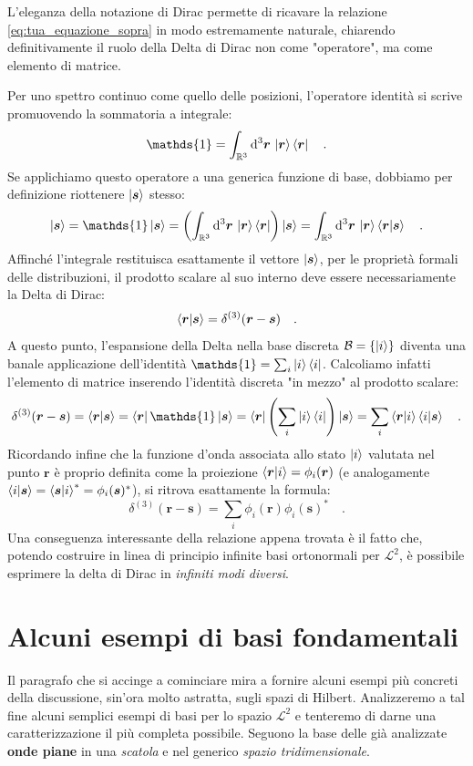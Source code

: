 \begin{approfondimento}[title={La completezza nel continuo e la Delta di Dirac}]
    \noindent
    L'eleganza della notazione di Dirac permette di ricavare la relazione \eqref{eq:tua_equazione_sopra} in modo estremamente naturale, chiarendo definitivamente il ruolo della Delta di Dirac non come "operatore", ma come elemento di matrice. 
    
    Per uno spettro continuo come quello delle posizioni, l'operatore identità si scrive promuovendo la sommatoria a integrale:
    \[
        \mathds{1} = \int_{\mathbb{R}^3} \dd^3{\bm{r}} \, \ket{\bm{r}}\bra{\bm{r}} \quad.
    \]
    Se applichiamo questo operatore a una generica funzione di base, dobbiamo per definizione riottenere $\ket{\bm{s}}$ stesso:
    \[
        \ket{\bm{s}} = \mathds{1}\ket{\bm{s}} = \left( \int_{\mathbb{R}^3} \dd^3{\bm{r}} \, \ket{\bm{r}}\bra{\bm{r}} \right) \ket{\bm{s}} = \int_{\mathbb{R}^3} \dd^3{\bm{r}} \, \ket{\bm{r}} \braket{\bm{r}}{\bm{s}} \quad.
    \]
    Affinché l'integrale restituisca esattamente il vettore $\ket{\bm{s}}$, per le proprietà formali delle distribuzioni, il prodotto scalare al suo interno deve essere necessariamente la Delta di Dirac:
    \[
        \braket{\bm{r}}{\bm{s}} = \delta^{(3)}(\bm{r}-\bm{s}) \quad.
    \]
    A questo punto, l'espansione della Delta nella base discreta $\mathcal{B} = \{ \ket{i} \}$ diventa una banale applicazione dell'identità $\mathds{1} = \sum_i \ket{i}\bra{i}$. Calcoliamo infatti l'elemento di matrice inserendo l'identità discreta "in mezzo" al prodotto scalare:
    \[
        \delta^{(3)}(\bm{r}-\bm{s}) = \braket{\bm{r}}{\bm{s}} = \bra{\bm{r}} \mathds{1} \ket{\bm{s}} = \bra{\bm{r}} \left( \sum_i \ket{i}\bra{i} \right) \ket{\bm{s}} = \sum_i \braket{\bm{r}}{i}\braket{i}{\bm{s}} \quad.
    \]
    Ricordando infine che la funzione d'onda associata allo stato $\ket{i}$ valutata nel punto $\bm{r}$ è proprio definita come la proiezione $\braket{\bm{r}}{i} = \phi_i(\bm{r})$ (e analogamente $\braket{i}{\bm{s}} = \braket{\bm{s}}{i}^* = \phi_i(\bm{s})^*$), si ritrova esattamente la formula:
    \[
        \delta^{(3)}(\bm{r}-\bm{s}) = \sum_i \phi_i(\bm{r}) \phi_i(\bm{s})^* \quad.
    \]
    Una conseguenza interessante della relazione appena trovata è il fatto che, potendo costruire in linea di principio infinite basi ortonormali per $\mathcal{L}^2$, è possibile esprimere la delta di Dirac in \emph{infiniti modi diversi}.
\end{approfondimento}

\section{Alcuni esempi di basi fondamentali}
Il paragrafo che si accinge a cominciare mira a fornire alcuni esempi più concreti della discussione, sin'ora molto astratta, sugli spazi di Hilbert. Analizzeremo a tal fine alcuni semplici esempi di basi per lo spazio $\mathcal{L}^2$ e tenteremo di darne una caratterizzazione il più completa possibile. Seguono la base delle già analizzate \textbf{onde piane} in una \emph{scatola} e nel generico \emph{spazio tridimensionale}.

